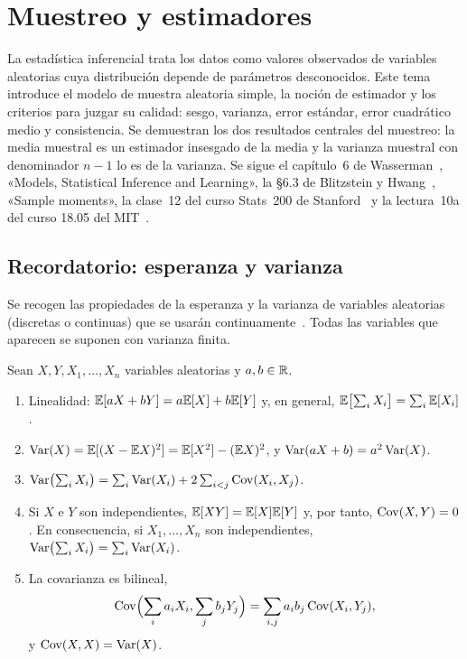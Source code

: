\chapter{Muestreo y estimadores}
\label{tema:2}

La estadística inferencial trata los datos como valores observados de variables aleatorias cuya distribución depende de parámetros desconocidos. Este tema introduce el modelo de muestra aleatoria simple, la noción de estimador y los criterios para juzgar su calidad: sesgo, varianza, error estándar, error cuadrático medio y consistencia. Se demuestran los dos resultados centrales del muestreo: la media muestral es un estimador insesgado de la media y la varianza muestral con denominador $n-1$ lo es de la varianza. Se sigue el capítulo~6 de Wasserman~\cite{wasserman}, «Models, Statistical Inference and Learning», la §6.3 de Blitzstein y Hwang~\cite{bh}, «Sample moments», la clase~12 del curso Stats~200 de Stanford~\cite{stats200} y la lectura~10a del curso 18.05 del MIT~\cite{mit1805}.

\section{Recordatorio: esperanza y varianza}

Se recogen las propiedades de la esperanza y la varianza de variables aleatorias (discretas o continuas) que se usarán continuamente~\cite[cap.~4 y §7.3]{bh}. Todas las variables que aparecen se suponen con varianza finita.

\begin{proposicion}\label{prop:t2-props}
Sean $X,Y,X_1,\dots,X_n$ variables aleatorias y $a,b\in\mathbb{R}$.
\begin{enumerate}
  \item Linealidad: $\mathbb{E}[aX+bY]=a\mathbb{E}[X]+b\mathbb{E}[Y]$ y, en general, $\mathbb{E}\bigl[\sum_iX_i\bigr]=\sum_i\mathbb{E}[X_i]$.
  \item $\operatorname{Var}(X)=\mathbb{E}[(X-\mathbb{E} X)^{2}]=\mathbb{E}[X^{2}]-(\mathbb{E} X)^{2}$, y $\operatorname{Var}(aX+b)=a^{2}\operatorname{Var}(X)$.
  \item $\operatorname{Var}\bigl(\sum_iX_i\bigr)=\sum_i\operatorname{Var}(X_i)+2\sum_{i<j}\operatorname{Cov}(X_i,X_j)$.
  \item Si $X$ e $Y$ son independientes, $\mathbb{E}[XY]=\mathbb{E}[X]\mathbb{E}[Y]$ y, por tanto, $\operatorname{Cov}(X,Y)=0$. En consecuencia, si $X_1,\dots,X_n$ son independientes, $\operatorname{Var}\bigl(\sum_iX_i\bigr)=\sum_i\operatorname{Var}(X_i)$.
  \item La covarianza es bilineal,
  \[
  \operatorname{Cov}\Bigl(\sum_ia_iX_i,\sum_jb_jY_j\Bigr)=\sum_{i,j}a_ib_j\operatorname{Cov}(X_i,Y_j),
  \]
  y $\operatorname{Cov}(X,X)=\operatorname{Var}(X)$.
\end{enumerate}
\end{proposicion}

